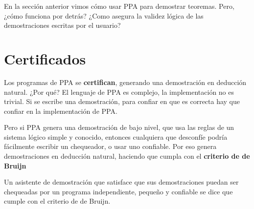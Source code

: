 
En la sección anterior vimos cómo usar PPA para demostrar teoremas. Pero, ¿cómo
funciona por detrás? ¿Como asegura la validez lógica de las demostraciones
escritas por el usuario?

\section{Certificados}

Los programas de PPA se \textbf{certifican}, generando una demostración en
deducción natural. ¿Por qué? El lenguaje de PPA es complejo, la implementación
no es trivial. Si se escribe una demostración, para confiar en que es correcta
hay que confiar en la implementación de PPA.

Pero si PPA genera una demostración de bajo nivel, que usa las reglas de un
sistema lógico simple y conocido, entonces cualquiera que desconfíe
podría fácilmente escribir un chequeador, o usar uno confiable. Por eso genera
demostraciones en deducción natural, haciendo que cumpla con el \textbf{criterio
de de Bruijn}

\begin{definition} Un asistente de
    demostración que satisface que sus demostraciones puedan ser chequeadas por
    un programa independiente, pequeño y confiable se dice que cumple con el
    criterio de de Bruijn.
\end{definition}

